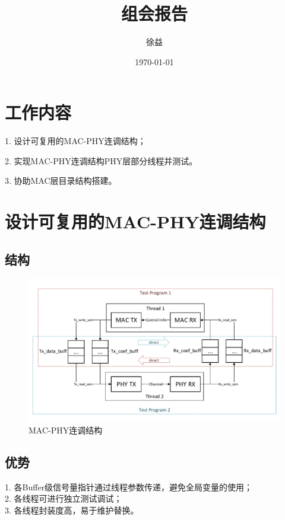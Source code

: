 \documentclass{article}
\title{组会报告}
\author{徐益}
\date{\today}
\begin{document}
\maketitle


\section{工作内容} 
1. 设计可复用的MAC-PHY连调结构；

2. 实现MAC-PHY连调结构PHY层部分线程并测试。

3. 协助MAC层目录结构搭建。

\section{设计可复用的MAC-PHY连调结构}
\subsection{结构}
\begin{figure}[H]
	\centering
	\includegraphics[width = \textwidth]{structure.pdf}
	\caption{MAC-PHY连调结构}
\end{figure}
\subsection{优势}
1. 各Buffer级信号量指针通过线程参数传递，避免全局变量的使用；\\
2. 各线程可进行独立测试调试；\\
3. 各线程封装度高，易于维护替换。


\end{document}
